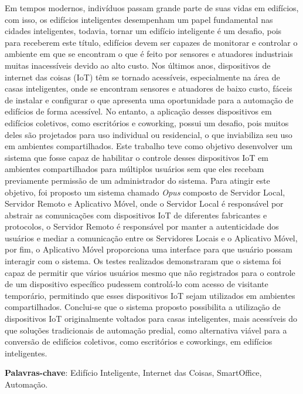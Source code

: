 \begin{resumo}
    Em tempos modernos, indivíduos passam grande parte de suas vidas em edifícios, com isso, os edifícios inteligentes desempenham um papel fundamental
    nas cidades inteligentes, todavia, tornar um edifício inteligente é um desafio, pois para receberem este título, edifícios devem ser capazes de 
    monitorar e controlar o ambiente em que se encontram o que é feito por sensores e atuadores industriais muitas inacessíveis devido ao alto custo.
    Nos últimos anos, dispositivos de internet das coisas (IoT) têm se tornado acessíveis, especialmente na área de casas inteligentes, onde se 
    encontram sensores e atuadores de baixo custo, fáceis de instalar e configurar o que apresenta uma oportunidade para a automação de edifícios
    de forma acessível. No entanto, a aplicação desses dispositivos em edifícios coletivos, como escritórios e coworking, possui um desafio, pois 
    muitos deles são projetados para uso individual ou residencial, o que inviabiliza seu uso em ambientes compartilhados.
    Este trabalho teve como objetivo desenvolver um sistema que fosse capaz de habilitar o controle desses dispositivos IoT em ambientes compartilhados
    para múltiplos usuários sem que eles recebam previamente permissão de um administrador do sistema.
    Para atingir este objetivo, foi proposto um sistema chamado \emph{Opus} composto de Servidor Local, Servidor Remoto e Aplicativo Móvel, onde o
    Servidor Local é responsável por abstrair as comunicações com dispositivos IoT de diferentes fabricantes e protocolos, o Servidor Remoto é responsável
    por manter a autenticidade dos usuários e mediar a comunicação entre os Servidores Locais e o Aplicativo Móvel, por fim, o Aplicativo Móvel
    proporciona uma interface para que usuário possam interagir com o sistema.
    Os testes realizados demonstraram que o sistema foi capaz de permitir que vários usuários mesmo que não registrados para o controle de um dispositivo
    específico pudessem controlá-lo com acesso de visitante temporário, permitindo que esses dispositivos IoT sejam utilizados em ambientes compartilhados.
    Conclui-se que o sistema proposto possibilita a utilização de dispositivos IoT originalmente voltados para casas inteligentes, mais acessíveis do
    que soluções tradicionais de automação predial, como alternativa viável para a conversão de edifícios coletivos, como escritórios e coworkings,
    em edifícios inteligentes.

    \vspace{\onelineskip}
    \noindent
    \textbf{Palavras-chave}: Edifício Inteligente, Internet das Coisas, SmartOffice, Automação.
\end{resumo}
    
